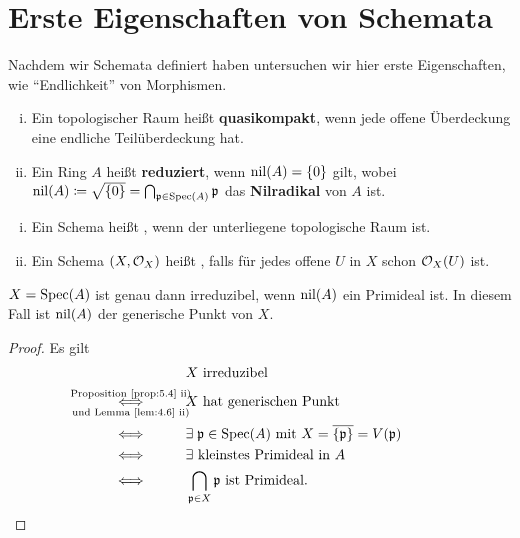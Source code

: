 
\chapter{Erste Eigenschaften von Schemata}
\label{chapter:6}

Nachdem wir Schemata definiert haben untersuchen wir hier erste Eigenschaften, wie \enquote{Endlichkeit} von Morphismen.

\begin{eri}
\label{eri:6.1}
	\begin{enumerate}[i)]
		\item Ein topologischer Raum heißt \textbf{quasikompakt}, wenn jede offene Überdeckung eine endliche Teilüberdeckung hat.
		\item Ein Ring $A$ heißt \textbf{reduziert}, wenn $\operatorname{nil}(A) = \{0\}$ gilt, wobei $\operatorname{nil}(A) \coloneqq \sqrt{\{0\}} = \bigcap_{\mathfrak{p} \in \operatorname{Spec}(A)} \mathfrak{p}$ das \textbf{Nilradikal} von $A$ ist.
	\end{enumerate}
\end{eri}

\begin{defn}
\label{defn:6.2}
	\begin{enumerate}[i)]
		\item Ein Schema heißt
		,
		wenn der unterliegene topologische Raum
		ist.
		\item Ein Schema $(X, \mathcal{O}_X)$ heißt
		,
		falls für jedes offene $U$ in $X$ schon $\mathcal{O}_X(U)$
		ist.
	\end{enumerate}
\end{defn}

\begin{lem}
\label{lem:6.3}
	$X=\operatorname{Spec}(A)$ ist genau dann irreduzibel, wenn $\operatorname{nil}(A)$ ein Primideal ist. In diesem Fall ist $\operatorname{nil}(A)$ der generische Punkt von $X$.
	\begin{proof}
		Es gilt
		\begin{align*}
			&X \text{ irreduzibel}\\
			\underset{\mathclap{\text{und Lemma~\ref{lem:4.6} ii)}}}{\overset{\mathclap{\text{Proposition~\ref{prop:5.4} ii)}}}{\Longleftrightarrow}} \qquad\quad & X \text{ hat generischen Punkt}\\
			 \Longleftrightarrow \qquad\quad & \exists\; \mfp \in \Spec(A) \text{ mit } X = \overline{\{\mfp\}} = V(\mfp)\\
			 \Longleftrightarrow \qquad\quad & \exists \text{ kleinstes Primideal in } A\\
			 \Longleftrightarrow \qquad\quad &  \bigcap_{\mfp \in X} \mfp \text{ ist Primideal} .
		\end{align*}
	\end{proof}
\end{lem}

